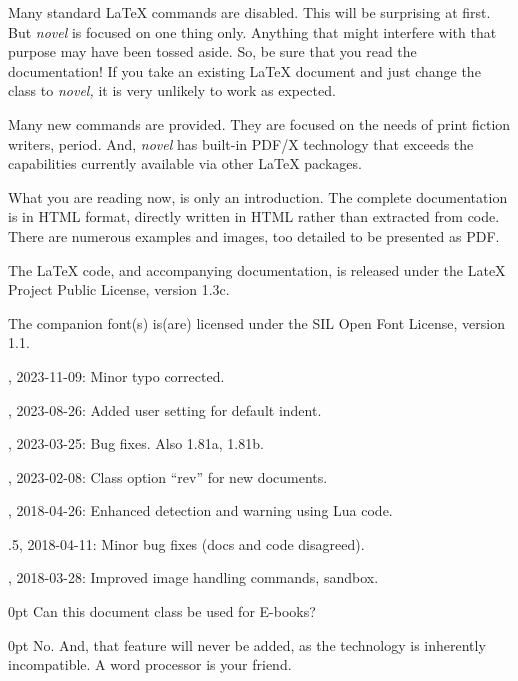 \documentclass{novel} %
\begin{document}
Many standard LaTeX commands are disabled. This will be surprising at first. But \emph{novel} is focused on one thing only. Anything that might interfere with that purpose may have been tossed aside. So, be sure that you read the documentation! If you take an existing LaTeX document and just change the class to \emph{novel,} it is very unlikely to work as expected.

Many new commands are provided. They are focused on the needs of print fiction writers, period. And, \emph{novel} has built-in PDF/X technology that exceeds the capabilities currently available via other LaTeX packages.


What you are reading now, is only an introduction. The complete documentation is in HTML format, directly written in HTML rather than extracted from code. There are numerous examples and images, too detailed to be presented as PDF.


The LaTeX code, and accompanying documentation, is released under the LateX Project Public License, version 1.3c.

The companion font(s) is(are) licensed under the SIL Open Font License, version 1.1.




, 2023-11-09: Minor typo corrected.

, 2023-08-26: Added user setting for default indent.

, 2023-03-25: Bug fixes. Also 1.81a, 1.81b.

, 2023-02-08: Class option ``rev'' for new documents.

, 2018-04-26: Enhanced detection and warning using Lua code.

.5, 2018-04-11: Minor bug fixes (docs and code disagreed).

, 2018-03-28: Improved image handling commands, sandbox.

\clearpage


\begin{adjustwidth}{\parindent}{0pt}
\backindent{}Can this document class be used for E-books?
\end{adjustwidth}
\begin{adjustwidth}{\parindent}{0pt}
\backindent{}No. And, that feature will never be added, as the technology is inherently incompatible. A word processor is your friend.
\end{adjustwidth}
\end{document}
